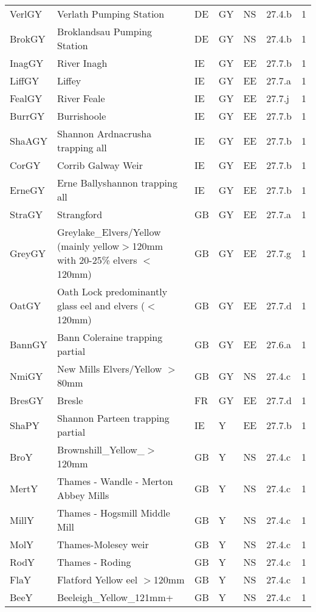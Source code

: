 \begin{table}[htbp]
\begin{tabularx}{\textwidth}{p{1.3cm}p{6.5cm}p{1cm}p{1cm}p{1cm}p{1cm}p{1.4cm}}
  VerlGY & Verlath Pumping Station & DE & GY & NS & 27.4.b &   1 \\ 
  BrokGY & Broklandsau Pumping Station & DE & GY & NS & 27.4.b &   1 \\ 
  InagGY & River Inagh & IE & GY & EE & 27.7.b &   1 \\ 
  LiffGY & Liffey & IE & GY & EE & 27.7.a &   1 \\ 
  FealGY & River Feale & IE & GY & EE & 27.7.j &   1 \\ 
  BurrGY & Burrishoole & IE & GY & EE & 27.7.b &   1 \\ 
  ShaAGY & Shannon Ardnacrusha trapping all & IE & GY & EE & 27.7.b &   1 \\ 
  CorGY & Corrib Galway Weir & IE & GY & EE & 27.7.b &   1 \\ 
  ErneGY & Erne Ballyshannon trapping all & IE & GY & EE & 27.7.b &   1 \\ 
  StraGY & Strangford & GB & GY & EE & 27.7.a &   1 \\ 
  GreyGY & Greylake\_Elvers/Yellow (mainly yellow$>$120mm with 20-25\% elvers $<$120mm) & GB & GY & EE & 27.7.g &   1 \\ 
  OatGY & Oath Lock predominantly glass eel and elvers ($<$120mm) & GB & GY & EE & 27.7.d &   1 \\ 
  BannGY & Bann Coleraine trapping partial & GB & GY & EE & 27.6.a &   1 \\ 
  NmiGY & New Mills Elvers/Yellow $>$80mm & GB & GY & NS & 27.4.c &   1 \\ 
  BresGY & Bresle & FR & GY & EE & 27.7.d &   1 \\ 
  ShaPY & Shannon Parteen trapping partial & IE & Y & EE & 27.7.b &   1 \\ 
  BroY & Brownshill\_Yellow\_$>$120mm & GB & Y & NS & 27.4.c &   1 \\ 
  MertY & Thames - Wandle - Merton Abbey Mills & GB & Y & NS & 27.4.c &   1 \\ 
  MillY & Thames - Hogsmill  Middle Mill & GB & Y & NS & 27.4.c &   1 \\ 
  MolY & Thames-Molesey weir & GB & Y & NS & 27.4.c &   1 \\ 
  RodY & Thames - Roding & GB & Y & NS & 27.4.c &   1 \\ 
  FlaY & Flatford Yellow eel $>$120mm & GB & Y & NS & 27.4.c &   1 \\ 
  BeeY & Beeleigh\_Yellow\_121mm+ & GB & Y & NS & 27.4.c &   1 \\ 
   \hline
\end{tabularx}
\end{table}
